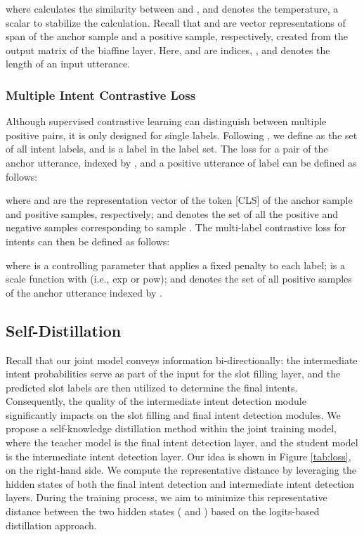 \documentclass{ecai}
\begin{document}
where  calculates the similarity between  and , and  denotes the temperature, a scalar to stabilize the calculation. Recall that  and  are vector representations of span  of the anchor sample and a positive sample, respectively, created from the output matrix of the biaffine layer. Here,  and  are indices, , and  denotes the length of an input utterance. 

\subsubsection{Multiple Intent Contrastive Loss}
Although supervised contrastive learning can distinguish between multiple positive pairs, it is only designed for single labels. Following \cite{zhang:2022}, we define  as the set of all intent labels, and  is a label in the label set. The loss for a pair of the anchor utterance, indexed by , and a positive utterance of label  can be defined as follows:

where  and  are the representation vector of the token [CLS] of the anchor sample and positive samples, respectively; and  denotes the set of all the positive and negative samples corresponding to sample . The multi-label contrastive loss for intents can then be defined as follows:


where  is a controlling parameter that applies a fixed penalty to each label;  is a scale function with  (i.e., exp or pow); and  denotes the set of all positive samples of the anchor utterance indexed by . 
\subsection{Self-Distillation}

Recall that our joint model conveys information bi-directionally: the intermediate intent probabilities serve as part of the input for the slot filling layer, and the predicted slot labels are then utilized to determine the final intents. Consequently, the quality of the intermediate intent detection module significantly impacts on the slot filling and final intent detection modules. We propose a self-knowledge distillation method within the joint training model, where the teacher model is the final intent detection layer, and the student model is the intermediate intent detection layer. Our idea is shown in Figure \ref{tab:loss}, on the right-hand side. We compute the representative distance by leveraging the hidden states of both the final intent detection and intermediate intent detection layers. During the training process, we aim to minimize this representative distance between the two hidden states ( and ) based on the logits-based distillation approach.
\end{document}
